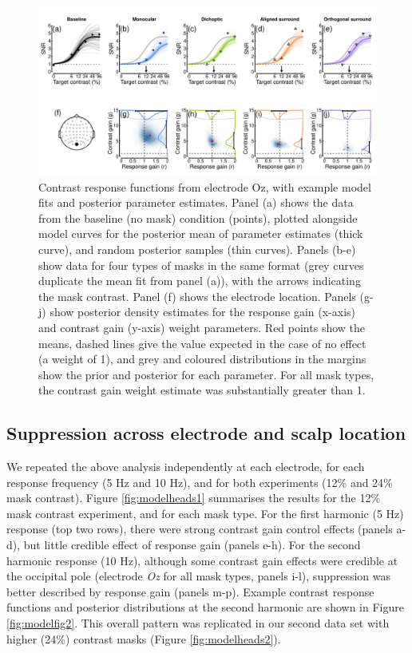 \documentclass[]{article}
\begin{document}
\begin{figure}

{\centering \includegraphics{figures/modelfig1} 

}

\caption{Contrast response functions from electrode Oz, with example model fits and posterior parameter estimates. Panel (a) shows the data from the baseline (no mask) condition (points), plotted alongside model curves for the posterior mean of parameter estimates (thick curve), and random posterior samples (thin curves). Panels (b-e) show data for four types of masks in the same format (grey curves duplicate the mean fit from panel (a)), with the arrows indicating the mask contrast. Panel (f) shows the electrode location. Panels (g-j) show posterior density estimates for the response gain (x-axis) and contrast gain (y-axis) weight parameters. Red points show the means, dashed lines give the value expected in the case of no effect (a weight of 1), and grey and coloured distributions in the margins show the prior and posterior for each parameter. For all mask types, the contrast gain weight estimate was substantially greater than 1.}\label{fig:modelfig1}
\end{figure}

\hypertarget{suppression-across-electrode-and-scalp-location}{%
\subsection{Suppression across electrode and scalp location}\label{suppression-across-electrode-and-scalp-location}}

We repeated the above analysis independently at each electrode, for each response frequency (5 Hz and 10 Hz), and for both experiments (12\% and 24\% mask contrast). Figure \ref{fig:modelheads1} summarises the results for the 12\% mask contrast experiment, and for each mask type. For the first harmonic (5 Hz) response (top two rows), there were strong contrast gain control effects (panels a-d), but little credible effect of response gain (panels e-h). For the second harmonic response (10 Hz), although some contrast gain effects were credible at the occipital pole (electrode \emph{Oz} for all mask types, panels i-l), suppression was better described by response gain (panels m-p). Example contrast response functions and posterior distributions at the second harmonic are shown in Figure \ref{fig:modelfig2}. This overall pattern was replicated in our second data set with higher (24\%) contrast masks (Figure \ref{fig:modelheads2}).
\end{document}
